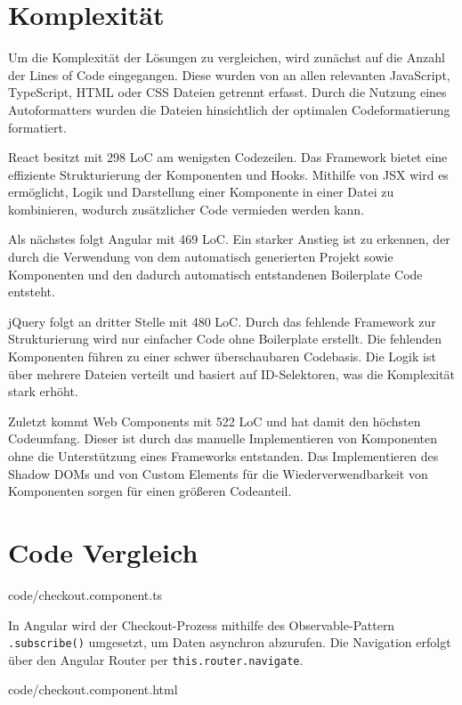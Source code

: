 \documentclass[oneside]{ausarbeitung}
\begin{document}
\section{Komplexität}

Um die Komplexität der Lösungen zu vergleichen, wird zunächst auf die Anzahl der Lines of Code eingegangen. Diese wurden von an allen relevanten JavaScript, TypeScript, HTML oder CSS Dateien getrennt erfasst. Durch die Nutzung eines Autoformatters wurden die Dateien hinsichtlich der optimalen Codeformatierung formatiert. 

React besitzt mit 298 LoC am wenigsten Codezeilen. Das Framework bietet eine effiziente Strukturierung der Komponenten und Hooks. Mithilfe von JSX wird es ermöglicht, Logik und Darstellung einer Komponente in einer Datei zu kombinieren, wodurch zusätzlicher Code vermieden werden kann. 

Als nächstes folgt Angular mit 469 LoC. Ein starker Anstieg ist zu erkennen, der durch die Verwendung von dem automatisch generierten Projekt sowie Komponenten und den dadurch automatisch entstandenen Boilerplate Code entsteht. 

jQuery folgt an dritter Stelle mit 480 LoC. Durch das fehlende Framework zur Strukturierung wird nur einfacher Code ohne Boilerplate erstellt. Die fehlenden Komponenten führen zu einer schwer überschaubaren Codebasis. Die Logik ist über mehrere Dateien verteilt und basiert auf ID-Selektoren,  was die Komplexität stark erhöht. 

Zuletzt kommt Web Components mit 522 LoC und hat damit den höchsten Codeumfang. Dieser ist durch das manuelle Implementieren von Komponenten ohne die Unterstützung eines Frameworks entstanden. Das Implementieren des Shadow DOMs und von Custom Elements für die Wiederverwendbarkeit von Komponenten sorgen für einen größeren Codeanteil. 

\section{Code Vergleich}

 {code/checkout.component.ts}

In Angular wird der Checkout-Prozess mithilfe des Observable-Pattern \texttt{.subscribe()} umgesetzt, um Daten asynchron abzurufen. Die Navigation erfolgt über den Angular Router per \texttt{this.router.navigate}.

 {code/checkout.component.html}
\end{document}
